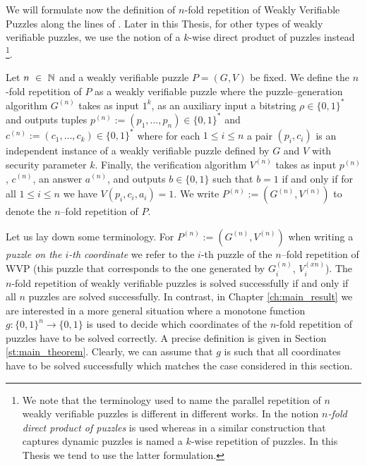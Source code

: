 We will formulate now the definition of $n$-fold repetition of Weakly Verifiable Puzzles along the lines of \cite{canetti2004hardness}.
Later in this Thesis, for other types of weakly verifiable puzzles, we use the notion of a $k$-wise direct product of puzzles instead \footnote{We
note that the terminology used to name the parallel repetition of $n$ weakly verifiable puzzles is different in different works.
In \cite{canetti2004hardness} the notion \textit{$n$-fold direct product of puzzles} is used whereas in \cite{Dodis:2009:SAI:1530441.1530450}
a similar construction that captures dynamic puzzles is named a $k$-wise repetition of puzzles.
In this Thesis we tend to use the latter formulation.}.
%
\begin{definition}
  \label{def:n-fold-rep}
  Let $n~\in~\mathbb{N}$ and a weakly verifiable puzzle $P = (G,V)$ be fixed.
  We define the $n$-fold repetition of $P$ as a weakly verifiable puzzle where the puzzle--generation algorithm
  $G^{(n)}$ takes as input $1^k$, as an auxiliary input a bitstring $\rho \in \{0,1\}^{*}$
  and outputs tuples $p^{(n)} := (p_1, \dotsc, p_n) \in \{0,1\}^{*}$ and $c^{(n)} := (c_1, \dotsc, c_k) \in \{0,1\}^{*}$
  where for each $1 \leq i \leq n$ a pair $(p_i, c_i)$ is an independent instance of a weakly verifiable puzzle defined by $G$ and $V$ with security parameter $k$.
  Finally, the verification algorithm $V^{(n)}$ takes as input $p^{(n)}$, $c^{(n)}$, an answer $a^{(n)}$, and outputs $b \in \{0,1\}$
  such that $b = 1$ if and only if for all $1 \leq i \leq n$ we have $V(p_i, c_i, a_i) = 1$.
  We write $P^{(n)} := (G^{(n)}, V^{(n)})$ to denote the $n$--fold repetition of $P$.
 \end{definition}
%
Let us lay down some terminology.
For $P^{(n) } := (G^{(n)},V^{(n)})$ when writing a \textit{puzzle on the $i$-th coordinate} we refer to the $i$-th puzzle of the $n$--fold repetition of WVP
(this puzzle that corresponds to the one generated by $G^{(n)}_i$,  $V^{(xn)}_i$).
The $n$-fold repetition of weakly verifiable puzzles is solved successfully if and only if all $n$ puzzles are solved successfully.
In contrast, in Chapter \ref{ch:main_result} we are interested in a more general situation where a monotone function $g: \{0,1\}^{n} \rightarrow \{0,1\}$ is used to decide
which coordinates of the $n$-fold repetition of puzzles have to be solved correctly. A precise definition is given in Section \ref{st:main_theorem}.
Clearly, we can assume that $g$ is such that all coordinates have to be solved successfully which matches the case considered in this section.


